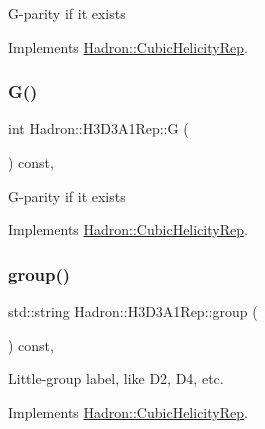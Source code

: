 G-\/parity if it exists 

Implements \mbox{\hyperlink{structHadron_1_1CubicHelicityRep_a50689f42be1e6170aa8cf6ad0597018b}{Hadron\+::\+Cubic\+Helicity\+Rep}}.

\mbox{\label{structHadron_1_1H3D3A1Rep_acc86f1e291571190123adf57dc635290}} 
\subsubsection{\texorpdfstring{G()}{G()}\hspace{0.1cm}{\footnotesize\ttfamily [2/2]}}
{\footnotesize\ttfamily int Hadron\+::\+H3\+D3\+A1\+Rep\+::G (\begin{DoxyParamCaption}{ }\end{DoxyParamCaption}) const\hspace{0.3cm}{\ttfamily [inline]}, {\ttfamily [virtual]}}

G-\/parity if it exists 

Implements \mbox{\hyperlink{structHadron_1_1CubicHelicityRep_a50689f42be1e6170aa8cf6ad0597018b}{Hadron\+::\+Cubic\+Helicity\+Rep}}.

\mbox{\label{structHadron_1_1H3D3A1Rep_a4b4fc6752f25df5714c95532184a4f8e}} 
\subsubsection{\texorpdfstring{group()}{group()}\hspace{0.1cm}{\footnotesize\ttfamily [1/3]}}
{\footnotesize\ttfamily std\+::string Hadron\+::\+H3\+D3\+A1\+Rep\+::group (\begin{DoxyParamCaption}{ }\end{DoxyParamCaption}) const\hspace{0.3cm}{\ttfamily [inline]}, {\ttfamily [virtual]}}

Little-\/group label, like D2, D4, etc. 

Implements \mbox{\hyperlink{structHadron_1_1CubicHelicityRep_a101a7d76cd8ccdad0f272db44b766113}{Hadron\+::\+Cubic\+Helicity\+Rep}}.

\mbox{\label{structHadron_1_1H3D3A1Rep_a4b4fc6752f25df5714c95532184a4f8e}} 
